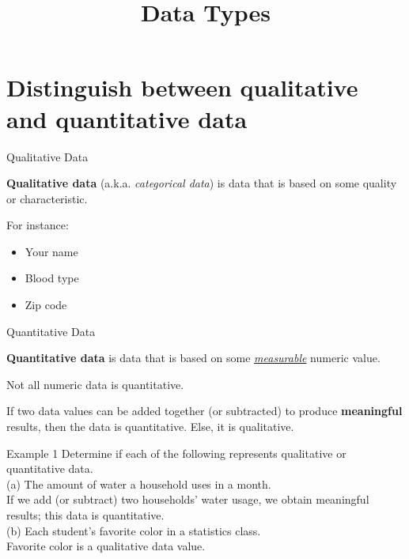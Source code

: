 \documentclass[t]{beamer}
\title{Data Types}
\author{}
\date{}
\begin{document}
\begin{frame} 
\maketitle
\end{frame}

\section{Distinguish between qualitative and quantitative data}

\begin{frame}{Qualitative Data}
\begin{tcolorbox}[colframe=green!20!black, colback = green!30!white,title=\textbf{Qualitative Data}]
\textbf{Qualitative data} (a.k.a. \textit{categorical data}) is data that is based on some quality or characteristic.
\end{tcolorbox}
\vspace{6pt} 
For instance:
\begin{itemize}
	\item<2->{Your name}
	\item<3->{Blood type}
	\item<4->{Zip code}
\end{itemize} 
\end{frame}

\begin{frame}{Quantitative Data}
\begin{tcolorbox}[colframe=green!20!black, colback = green!30!white,title=\textbf{Quantitative Data}]
\textbf{Quantitative data} is data that is based on some \emph{\underline{measurable}} numeric value.
\end{tcolorbox}
\vspace{6pt} \pause
Not all numeric data is quantitative.	\newline\\	\pause

If two data values can be added together (or subtracted) to produce {\color{blue}\textbf{meaningful}} results, then the data is quantitative. Else, it is qualitative.
\end{frame}

\begin{frame}{Example 1}
Determine if each of the following represents qualitative or quantitative data.	\newline\\
(a) \quad The amount of water a household uses in a month. \newline\\	\pause
If we add (or subtract) two households' water usage, we obtain meaningful results; this data is quantitative.	\newline\\	\pause
(b) \quad Each student's favorite color in a statistics class. \newline\\ \pause
Favorite color is a qualitative data value. 
\end{frame}
\end{document}
